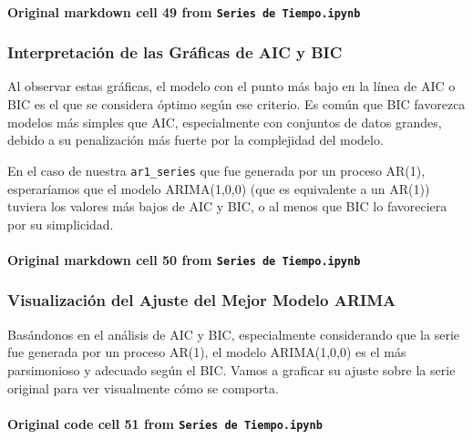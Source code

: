 \documentclass[
  11pt,
]{article}
\begin{document}
\paragraph{\texorpdfstring{Original markdown cell 49 from \texttt{Series\ de\ Tiempo.ipynb}}{Original markdown cell 49 from Series de Tiempo.ipynb}}\label{original-markdown-cell-49-from-series-de-tiempoipynb}

\subsubsection{Interpretación de las Gráficas de AIC y BIC}\label{interpretaciuxf3n-de-las-gruxe1ficas-de-aic-y-bic}

Al observar estas gráficas, el modelo con el punto más bajo en la línea de AIC o BIC es el que se considera óptimo según ese criterio. Es común que BIC favorezca modelos más simples que AIC, especialmente con conjuntos de datos grandes, debido a su penalización más fuerte por la complejidad del modelo.

En el caso de nuestra \texttt{ar1\_series} que fue generada por un proceso AR(1), esperaríamos que el modelo ARIMA(1,0,0) (que es equivalente a un AR(1)) tuviera los valores más bajos de AIC y BIC, o al menos que BIC lo favoreciera por su simplicidad.

\paragraph{\texorpdfstring{Original markdown cell 50 from \texttt{Series\ de\ Tiempo.ipynb}}{Original markdown cell 50 from Series de Tiempo.ipynb}}\label{original-markdown-cell-50-from-series-de-tiempoipynb}

\subsubsection{Visualización del Ajuste del Mejor Modelo ARIMA}\label{visualizaciuxf3n-del-ajuste-del-mejor-modelo-arima}

Basándonos en el análisis de AIC y BIC, especialmente considerando que la serie fue generada por un proceso AR(1), el modelo ARIMA(1,0,0) es el más parsimonioso y adecuado según el BIC. Vamos a graficar su ajuste sobre la serie original para ver visualmente cómo se comporta.

\paragraph{\texorpdfstring{Original code cell 51 from \texttt{Series\ de\ Tiempo.ipynb}}{Original code cell 51 from Series de Tiempo.ipynb}}\label{original-code-cell-51-from-series-de-tiempoipynb}
\end{document}
